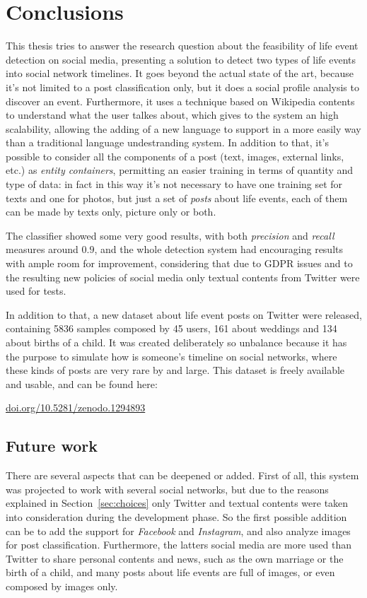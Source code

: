 \chapter{Conclusions}
\label{cha:conclusions}
This thesis tries to answer the research question about the feasibility of life event detection on social media, presenting a solution to detect two types of life events into social network timelines. It goes beyond the actual state of the art, because it's not limited to a post classification only, but it does a social profile analysis to discover an event. Furthermore, it uses a technique based on Wikipedia contents to understand what the user talkes about, which gives to the system an high scalability, allowing the adding of a new language to support in a more easily way than a traditional language undestranding system. In addition to that, it's possible to consider all the components of a post (text, images, external links, etc.) as \emph{entity containers}, permitting an easier training in terms of quantity and type of data: in fact in this way it's not necessary to have one training set for texts and one for photos, but just a set of \emph{posts} about life events, each of them can be made by texts only, picture only or both.

The classifier showed some very good results, with both \emph{precision} and \emph{recall} measures around $0.9$, and the whole detection system had encouraging results with ample room for improvement, considering that due to GDPR issues and to the resulting new policies of social media only textual contents from Twitter were used for tests.

In addition to that, a new dataset about life event posts on Twitter were released, containing 5836 samples composed by 45 users, 161 about weddings and 134 about births of a child. It was created deliberately so unbalance because it has the purpose to simulate how is someone's timeline on social networks, where these kinds of posts are very rare by and large. This dataset is freely available and usable, and can be found here:
\begin{center}
\url{doi.org/10.5281/zenodo.1294893}
\end{center}

\section{Future work}
\label{sec:futurework}
There are several aspects that can be deepened or added. First of all, this system was projected to work with several social networks, but due to the reasons explained in Section~\ref{sec:choices} only Twitter and textual contents were taken into consideration during the development phase. So the first possible addition can be to add the support for \emph{Facebook} and \emph{Instagram}, and also analyze images for post classification. Furthermore, the latters social media are more used than Twitter to share personal contents and news, such as the own marriage or the birth of a child, and many posts about life events are full of images, or even composed by images only.

